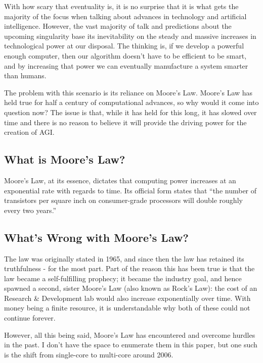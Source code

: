 \documentclass[12pt]{article} %
\begin{document}
With how scary that eventuality is, it is no surprise that it is what gets the majority of the focus when talking about advances in technology and artificial intelligence. However, the vast majority of talk and predictions about the upcoming singularity base its inevitability on the steady and massive increases in technological power at our disposal\cite{wbw2}. The thinking is, if we develop a powerful enough computer, then our algorithm doesn't have to be efficient to be smart, and by increasing that power we can eventually manufacture a system smarter than humans.

The problem with this scenario is its reliance on Moore's Law. Moore's Law has held true for half a century of computational advances, so why would it come into question now? The issue is that, while it has held for this long, it has slowed over time and there is no reason to believe it will provide the driving power for the creation of AGI.


\subsection{What is Moore's Law?} %

Moore's Law, at its essence, dictates that computing power increases at an exponential rate with regards to time. Its official form states that ``the number of transistors per square inch on consumer-grade processors will double roughly every two years.''


\subsection{What's Wrong with Moore's Law?} %

The law was originally stated in 1965, and since then the law has retained its truthfulness - for the most part. Part of the reason this has been true is that the law became a self-fulfilling prophecy; it became the industry goal, and hence spawned a second, sister Moore's Law (also known as Rock's Law): the cost of an Research \& Development lab would also increase exponentially over time. With money being a finite resource, it is understandable why both of these could not continue forever\cite{memristor}.

However, all this being said, Moore's Law has encountered and overcome hurdles in the past\cite{hurdle}\cite{speeds}. I don't have the space to enumerate them in this paper, but one such is the shift from single-core to multi-core around 2006.
\end{document}
